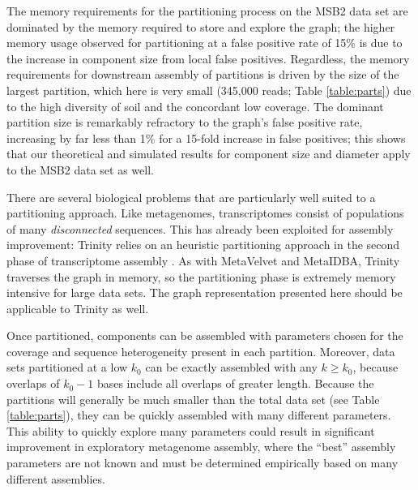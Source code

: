 \documentclass{pnastwo}
\begin{document}
\begin{article}
The memory requirements for the partitioning process on the MSB2 data
set are dominated by the memory required to store and explore the
graph; the higher memory usage observed for partitioning at a false
positive rate of 15\% is due to the increase in component size from
local false positives.  Regardless, the memory requirements for
downstream assembly of partitions is driven by the size of the largest
partition, which here is very small (345,000 reads; Table \ref{table:parts}) 
due to the high diversity of soil and the
concordant low coverage.  The dominant partition size is remarkably
refractory to the graph's false positive rate, increasing by far less
than 1\% for a 15-fold increase in false positives; this shows that
our theoretical and simulated results for component size and diameter
apply to the MSB2 data set as well.


There are several biological problems that are particularly well
suited to a partitioning approach.  Like metagenomes, transcriptomes
consist of populations of many {\em disconnected} sequences.  This has
already been exploited for assembly improvement: Trinity relies on an
heuristic partitioning approach in the second phase of transcriptome assembly
\cite{trinity}.  As with MetaVelvet and MetaIDBA, Trinity
traverses the graph in memory, so the partitioning phase is extremely
memory intensive for large data sets\cite{metavelvet,pubmed21685107,trinity}.
The graph representation presented here should be applicable to Trinity
as well.

Once partitioned, components can be assembled with parameters chosen
for the coverage and sequence heterogeneity present in each partition.
Moreover, data sets partitioned at a low $k_0$ can be exactly
assembled with any $k \ge k_0$, because overlaps of $k_0-1$ bases
include all overlaps of greater length.  Because the partitions will
generally be much smaller than the total data set (see Table
\ref{table:parts}), they can be quickly assembled with many different
parameters.  This ability to quickly explore many parameters could
result in significant improvement in exploratory metagenome assembly,
where the ``best'' assembly parameters are not known and must be
determined empirically based on many different assemblies.



\end{article}
\end{document}
